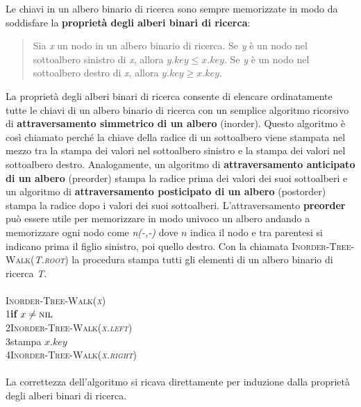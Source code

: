 \documentclass[10pt, a4paper]{report}
\newcommand\firsttab[1][0.5cm]{\hspace*{#1}}
\newcommand\secondtab[1][1cm]{\hspace*{#1}}
\begin{document}
Le chiavi in un albero binario di ricerca sono sempre memorizzate in modo da soddisfare la \textbf{proprietà degli alberi binari di ricerca}:
\begin{quote}
Sia \textit{x} un nodo in un albero binario di ricerca. Se \textit{y} è un nodo nel sottoalbero sinistro di \textit{x}, allora $y.key \leq x.key$. Se \textit{y} è un nodo nel sottoalbero destro di \textit{x}, allora $y.key \geq x.key$. 
\end{quote}
La proprietà degli alberi binari di ricerca consente di elencare ordinatamente tutte le chiavi di un albero binario di ricerca con un semplice algoritmo ricorsivo di \textbf{attraversamento simmetrico di un albero} (inorder). Questo algoritmo è così chiamato perché la chiave della radice di un sottoalbero viene stampata nel mezzo tra la stampa dei valori nel sottoalbero sinistro e la stampa dei valori nel sottoalbero destro. Analogamente, un algoritmo di \textbf{attraversamento anticipato di un albero} (preorder) stampa la radice prima dei valori dei suoi sottoalberi e un algoritmo di \textbf{attraversamento posticipato di un albero} (postorder) stampa la radice dopo i valori dei suoi sottoalberi. L'attraversamento \textbf{preorder} può essere utile per memorizzare in modo univoco un albero andando a memorizzare ogni nodo come \textit{n(-,-)} dove $n$ indica il nodo e tra parentesi si indicano prima il figlio sinistro, poi quello destro. Con la chiamata \textsc{Inorder-Tree-Walk(\textit{T.root})} la procedura stampa tutti gli elementi di un albero binario di ricerca \textit{T}.\\\\
\textsc{Inorder-Tree-Walk(\textit{x})}\\
1\firsttab\textbf{if} $x \not= \textsc{nil}$\\
2\secondtab\textsc{Inorder-Tree-Walk(\textit{x.left})}\\
3\secondtab stampa $x.key$\\
4\secondtab\textsc{Inorder-Tree-Walk(\textit{x.right})}\\\\
La correttezza dell'algoritmo si ricava direttamente per induzione dalla proprietà degli alberi binari di ricerca.
\end{document}
